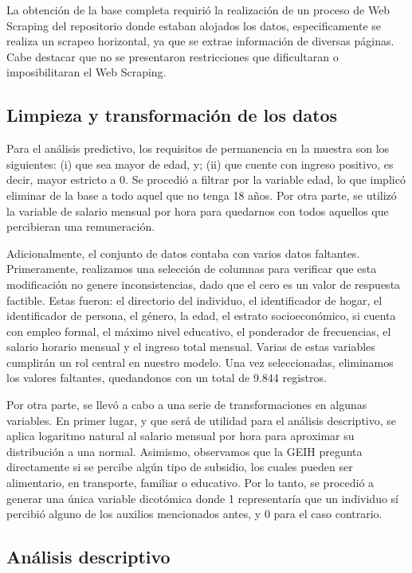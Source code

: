 \documentclass[11pt,oneside]{article}
\begin{document}
	La obtención de la base completa requirió la realización de un proceso de Web Scraping del repositorio donde estaban alojados los datos, especificamente se realiza un scrapeo horizontal, ya que se extrae información de diversas páginas. Cabe destacar que no se presentaron restricciones que dificultaran o imposibilitaran el Web Scraping. 
	
	\subsection{Limpieza y transformación de los datos}
	
	Para el análisis predictivo, los requisitos de permanencia en la muestra son los siguientes: (i) que sea mayor de edad, y; (ii) que cuente con ingreso positivo, es decir, mayor estricto a 0. Se procedió a filtrar por la variable edad, lo que implicó eliminar de la base a todo aquel que no tenga 18 años. Por otra parte, se utilizó la variable de salario mensual por hora para quedarnos con todos aquellos que percibieran una remuneración. 
	
	Adicionalmente, el conjunto de datos contaba con varios datos faltantes. Primeramente, realizamos una selección de columnas para verificar que esta modificación no genere inconsistencias, dado que el cero es un valor de respuesta factible. Estas fueron: el directorio del individuo, el identificador de hogar, el identificador de persona, el género, la edad, el estrato socioeconómico, si cuenta con empleo formal, el máximo nivel educativo, el ponderador de frecuencias, el salario horario mensual y el ingreso total mensual. Varias de estas variables cumplirán un rol central en nuestro modelo. Una vez seleccionadas, eliminamos los valores faltantes, quedandonos con un total de 9.844 registros.  
	
	Por otra parte, se llevó a cabo a una serie de transformaciones en algunas variables. En primer lugar, y que será de utilidad para el análisis descriptivo, se aplica logaritmo natural al salario mensual por hora para aproximar su distribución a una normal. Asimismo, observamos que la GEIH pregunta directamente si se percibe algún tipo de subsidio, los cuales pueden ser alimentario, en transporte, familiar o educativo. Por lo tanto, se procedió a generar una única variable dicotómica donde 1 representaría que un individuo sí percibió alguno de los auxilios mencionados antes, y 0 para el caso contrario.
	
	\subsection{Análisis descriptivo}
	
\end{document}
